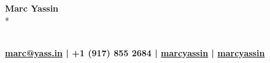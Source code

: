 \documentclass[letterpaper]{deedy-resume}
\begin{document}

\begin{flushleft}
\Huge \textbf{Marc Yassin}\\*
\begin{small}
\vspace{-8mm}
\normalsize \textbf
{
	{\footnotesize \\
		\textbf{
			\href{mailto:marc@yass.in}{\faEnvelopeO \hspace{1mm} marc@yass.in} \hspace{1mm} | \hspace{1mm} 
			\faPhone \hspace{1mm} +1 (917) 855 2684 \hspace{1mm} | \hspace{1mm} 
			\href{https://github.com/marcyassin}{\faGithub \hspace{1mm} marcyassin} \hspace{1mm} | \hspace{1mm} 
			\href{https://www.linkedin.com/in/marcyassin/}{\faLinkedin \hspace{1mm} marcyassin}
         }
    }
}
\end{small}
\end{flushleft}
\end{document}
